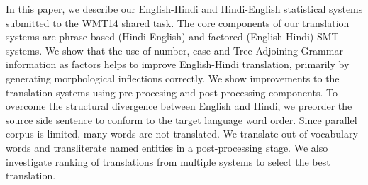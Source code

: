 In this paper, we describe our English-Hindi and Hindi-English statistical systems submitted to the WMT14 shared task. The core components of our translation systems are phrase based (Hindi-English) and factored (English-Hindi) SMT systems. We show that the use of number, case and Tree Adjoining Grammar information as factors helps to improve English-Hindi translation, primarily by generating morphological inflections correctly. We show improvements to the translation systems using pre-procesing and post-processing components. To overcome the structural divergence between English and Hindi, we preorder the source side sentence to conform to the target language word order. Since parallel corpus is limited, many words are not translated. We translate out-of-vocabulary words and transliterate named entities in a post-processing stage. We also investigate ranking of translations from multiple systems to select the best translation.
